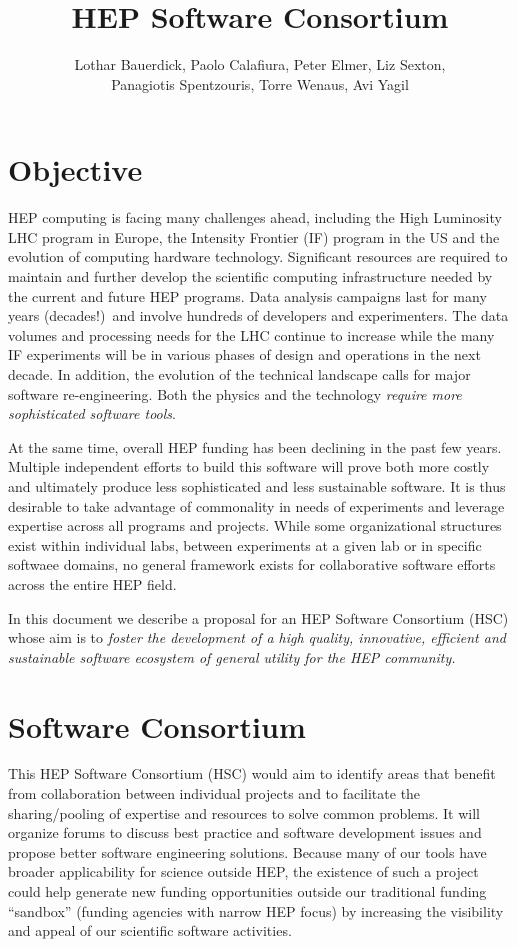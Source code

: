 \documentclass[12pt,letterpaper,fleqn]{article}
\author{Lothar Bauerdick, Paolo Calafiura, Peter Elmer, Liz Sexton, \\
Panagiotis Spentzouris, Torre Wenaus, Avi Yagil}
\title{HEP Software Consortium}
\begin{document}
\maketitle
\linenumbers

\section{Objective}
\label{sec:objective}


HEP computing is facing many challenges ahead, including the High
Luminosity LHC program in Europe, the Intensity Frontier (IF) program
in the US and the evolution of computing hardware technology.
Significant resources are required to maintain and further develop
the scientific computing infrastructure needed by the current and
future HEP programs.  Data analysis campaigns last for many years
(decades!)\ and involve hundreds of developers and experimenters.
The data volumes and processing needs for the LHC continue to
increase  while the many IF
experiments will be in various phases of design and operations in
the next decade.  In addition, the evolution of the technical
landscape calls for major software re-engineering. Both the
physics and the technology {\em require more sophisticated software
tools}.

At the same time, overall HEP funding has been declining in the past
few years. Multiple independent efforts to build this software
will prove both more costly and ultimately produce less
sophisticated and less sustainable software. It is thus
desirable to take advantage of commonality in
needs of experiments and leverage expertise across all programs and
projects. While some organizational structures exist within individual
labs, between experiments at a given lab or in specific softwaee domains,
no general framework exists for collaborative software efforts across the entire HEP field.

In this document we describe a proposal for an HEP Software Consortium
(HSC) whose aim is to {\em foster the development of a high quality,
innovative, efficient and sustainable software ecosystem of general
utility for the HEP community.}





\section{Software Consortium}
\label{sec:consortium}

This HEP Software Consortium
(HSC) would aim to identify areas that benefit from collaboration
between individual projects and to facilitate the sharing/pooling
of expertise and resources to solve common problems.  It will
organize forums to discuss best practice and software development
issues and propose better software engineering solutions. 
Because many of our tools have broader applicability for science
outside HEP, the existence of such a project could help generate
new funding opportunities outside our traditional funding ``sandbox''
(funding agencies with narrow HEP focus) by increasing the visibility
and appeal of our scientific software activities.
\end{document}
